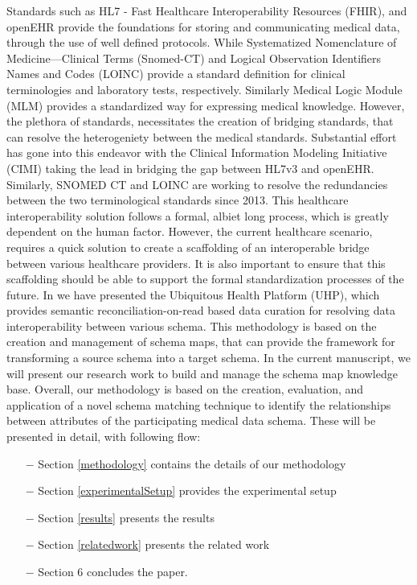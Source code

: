 \documentclass{ieeeaccess}
\begin{document}
Standards such as HL7 - Fast Healthcare Interoperability Resources (FHIR), and openEHR provide the foundations for storing and communicating medical data, through the use of well defined protocols. While Systematized Nomenclature of Medicine—Clinical Terms (Snomed-CT) \cite{snomedct_url} and Logical Observation Identifiers Names and Codes (LOINC) \cite{loinc} provide a standard definition for clinical terminologies and laboratory tests, respectively. Similarly Medical Logic Module (MLM) provides a standardized way for expressing medical knowledge. However, the plethora of standards, necessitates the creation of bridging standards, that can resolve the heterogeniety between the medical standards. Substantial effort has gone into this endeavor with the Clinical Information Modeling Initiative (CIMI) \cite{CIMI2015} taking the lead in bridging the gap between HL7v3 and openEHR. Similarly, SNOMED CT and LOINC are working to resolve the redundancies between the two terminological standards since 2013. This healthcare interoperability solution follows a formal, albiet long process, which is greatly dependent on the human factor. However, the current healthcare scenario, requires a quick solution to create a scaffolding of an interoperable bridge between various healthcare providers. It is also important to ensure that this scaffolding should be able to support the formal standardization processes of the future. In \cite{Satti2020}we have presented the Ubiquitous Health Platform (UHP), which provides semantic reconciliation-on-read based data curation for resolving data interoperability between various schema. This methodology is based on the creation and management of schema maps, that can provide the framework for transforming a source schema into a target schema. 
In the current manuscript, we will present our research work to build and manage the schema map knowledge base. Overall, our methodology is based on the creation, evaluation, and application of a novel schema matching technique to identify the relationships between attributes of the participating medical data schema. These will be presented in detail, with following flow:

\begin{itemize}
	\item[$-$] Section \ref{methodology} contains the details of our methodology
	\item[$-$] Section \ref{experimentalSetup} provides the experimental setup
	\item[$-$] Section \ref{results} presents the results
	\item[$-$] Section \ref{relatedwork} presents the related work
	\item[$-$] Section 6 concludes the paper.
\end{itemize}
\end{document}
